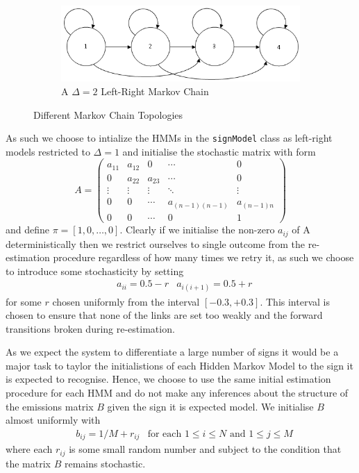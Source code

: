 \begin{figure} [h!]
\begin{subfigure}[b]{0.5\textwidth}
                \label{fig:clust}
        \end{subfigure}
	   \begin{subfigure}[b]{0.5\textwidth}
                \centering
                \includegraphics[width=1.0\textwidth]{ThesisFigs/del2LRMC}
                \caption{A $\Delta = 2$ Left-Right Markov Chain}
                \label{fig:clust}
        \end{subfigure}
        \caption{Different Markov Chain Topologies}\label{fig:mctop}
\end{figure}

As such we choose to intialize the HMMs in the \verb|signModel| class as left-right models restricted to $\Delta = 1$ and initialise the stochastic matrix with form
\begin{equation*}
A =
 \begin{pmatrix}
  a_{11} & a_{12} & 0 & \cdots & 0 \\
  0 & a_{22} & a_{23} &\cdots & 0 \\
  \vdots  & \vdots  & \vdots & \ddots & \vdots  \\
  0 & 0 & \cdots & a_{(n-1)(n-1)}& a_{(n-1)n} \\
  0 & 0 & \cdots & 0& 1
 \end{pmatrix}
\end{equation*}
and define $\pi = [1,0, \dots, 0]$. Clearly if we initialise the non-zero $a_{ij}$ of A deterministically then we restrict ourselves to single outcome from the re-estimation procedure regardless of how many times we retry it, as such we choose to introduce some stochasticity by setting
\begin{align*}
&a_{ii} = 0.5 - r &a_{i(i+1)} = 0.5 + r
\end{align*}
 for some $r$ chosen uniformly from the interval $[-0.3, +0.3]$. This interval is chosen to ensure that none of the links are set too weakly and the forward transitions broken during re-estimation.

As we expect the system to differentiate a large number of signs it would be a major task to taylor the initialistions of each Hidden Markov Model to the sign it is expected to recognise. Hence, we choose to use the same initial estimation procedure for each HMM and do not make any inferences about the structure of the emissions matrix $B$ given the sign it is expected model. We initialise $B$ almost uniformly with
\begin{align*}
&b_{ij} = 1/M + r_{ij} &\text{for each $1\leq i \leq N$ and $1 \leq j \leq M$}
\end{align*}
where each $r_{ij}$ is some small random number and subject to the condition that the matrix $B$ remains stochastic.

